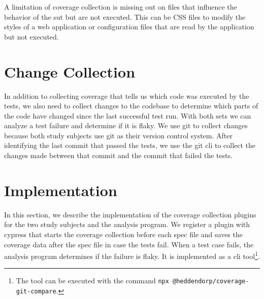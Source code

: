 A limitation of coverage collection is missing out on files that influence the behavior of the \ac{sut} but are not executed.
This can be CSS files to modify the styles of a web application or configuration files that are read by the application but not executed.
\section{Change Collection}
In addition to collecting coverage that tells us which code was executed by the tests, we also need to collect changes to the codebase to determine which parts of the code have changed since the last successful test run.
With both sets we can analyze a test failure and determine if it is flaky.
We use git to collect changes because both study subjects use git as their version control system.
After identifying the last commit that passed the tests, we use the git \ac{cli} to collect the changes made between that commit and the commit that failed the tests.

\section{Implementation}
In this section, we describe the implementation of the coverage collection plugins for the two study subjects and the analysis program.
We register a plugin with cypress that starts the coverage collection before each spec file and saves the coverage data after the spec file in case the tests fail.
When a test case fails, the analysis program determines if the failure is flaky.
It is implemented as a \ac{cli} tool\footnote{The tool can be executed with the command \texttt{npx @heddendorp/coverage-git-compare}.}.


